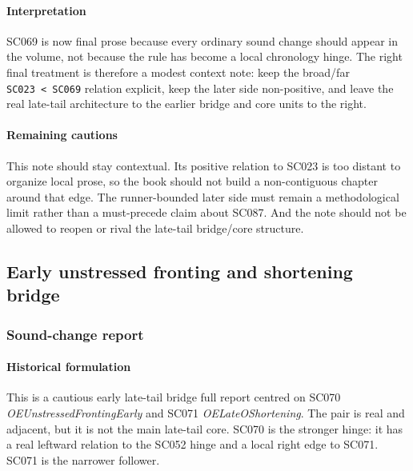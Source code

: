 \documentclass[
  british,
  a4paper,
]{article}
\begin{document}
\paragraph{Interpretation}\label{interpretation-43}

SC069 is now final prose because every ordinary sound change should
appear in the volume, not because the rule has become a local chronology
hinge. The right final treatment is therefore a modest context note:
keep the broad/far \texttt{SC023\ \textless{}\ SC069} relation explicit,
keep the later side non-positive, and leave the real late-tail
architecture to the earlier bridge and core units to the right.

\paragraph{Remaining cautions}\label{remaining-cautions-43}

This note should stay contextual. Its positive relation to SC023 is too
distant to organize local prose, so the book should not build a
non-contiguous chapter around that edge. The runner-bounded later side
must remain a methodological limit rather than a must-precede claim
about SC087. And the note should not be allowed to reopen or rival the
late-tail bridge/core structure.

\subsection{Early unstressed fronting and shortening
bridge}\label{early-unstressed-fronting-and-shortening-bridge}

\subsubsection{Sound-change report}\label{sound-change-report-44}

\paragraph{Historical formulation}\label{historical-formulation-44}

This is a cautious early late-tail bridge full report centred on SC070
\emph{OEUnstressedFrontingEarly} and SC071 \emph{OELateOShortening}. The
pair is real and adjacent, but it is not the main late-tail core. SC070
is the stronger hinge: it has a real leftward relation to the SC052
hinge and a local right edge to SC071. SC071 is the narrower follower.
\end{document}

